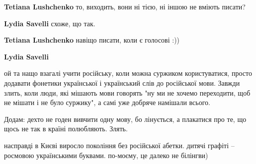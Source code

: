 \begin{itemize}
\begin{itemize}
 
\textbf{Tetiana Lushchenko} то, виходить, вони ні тією, ні іншою не вміють писати? \Smiley[1.0][yellow]

 
\textbf{Lydia Savelli} схоже, що так.

 
\textbf{Tetiana Lushchenko} навіщо писати, коли є голосові :))

 
\textbf{Lydia Savelli} 

ой та нащо взагалі учити російську, коли можна суржиком користуватися, просто
додавати фонетики української і український слів до російської мови. Завжди
злить, коли люди, які мішають мови говорять "ну ми не хочемо переходити, щоб не
мішати і не було суржику", а самі уже добряче намішали всього.

Додам: дехто не годен вивчити одну мову, бо лінується, а плакатися про те, що
щось не так в країні полюбляють. Злять.


 

насправді в Києві виросло покоління без російської абетки. дитячі графіті –
росмовою українськими буквами. по-моєму, це далеко не білінгви)
\end{itemize}


\end{itemize}
